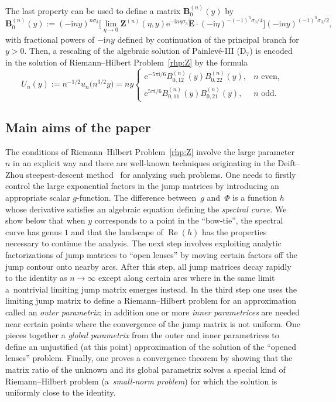\documentclass[pdftex]{sigma}
\numberwithin{equation}{section}
\begin{document}
The last property can be used to define a matrix $\mathbf{B}^{(n)}_0(y)$ by
\begin{equation}
\mathbf{B}^{(n)}_0(y):=(-\mathrm{i} ny)^{n\sigma_3}\Big[\lim_{\eta\to 0}\mathbf{Z}^{(n)}(\eta,y)\mathrm{e}^{-\mathrm{i} n\eta\sigma_3}\widetilde{\mathbf{E}}\cdot(-\mathrm{i}\eta)^{-(-1)^n\sigma_3/4}\Big](-\mathrm{i} n y)^{(-1)^n\sigma_3/2},
\label{eq:B0n}
\end{equation}
with fractional powers of $-\mathrm{i} n y$ defined by continuation of the principal branch for $y>0$.
Then, a rescaling of the algebraic solution of Painlev\'e-III (D$_7$) is encoded in the solution of Riemann--Hilbert Problem~\ref{rhp:Z} by the formula
\begin{equation}
U_n(y):=n^{-1/2}u_n\bigl(n^{3/2}y\bigr) =ny\begin{cases}\mathrm{e}^{-5\pi\mathrm{i}/6}B_{0,12}^{(n)}(y)B_{0,22}^{(n)}(y),& \text{$n$ even}, \\
\mathrm{e}^{5\pi\mathrm{i}/6}B_{0,11}^{(n)}(y)B_{0,21}^{(n)}(y),& \text{$n$ odd.}
\end{cases}
\label{eq:Uny}
\end{equation}

\subsection{Main aims of the paper}
The conditions of Riemann--Hilbert Problem~\ref{rhp:Z} involve the large parameter $n$ in an explicit way and there are well-known techniques originating in the Deift--Zhou steepest-descent method~\cite{DeiftZ93} for analyzing such problems. One needs to firstly control the large exponential factors in the jump matrices by introducing an appropriate scalar $g$-function. The difference between~$g$ and~$\Phi$ is a function $h$ whose derivative satisfies an algebraic equation defining the \emph{spectral curve}. We show below that when $y$ corresponds to a point in the ``bow-tie'', the spectral curve has genus $1$ and that the landscape of $\operatorname{Re}(h)$ has the properties necessary to continue the analysis. The next step involves exploiting analytic factorizations of jump matrices to ``open lenses'' by moving certain factors off the jump contour onto nearby arcs. After this step, all jump matrices decay rapidly to the identity as $n\to\infty$ except along certain arcs where in the same limit a~nontrivial limiting jump matrix emerges instead. In the third step one uses the limiting jump matrix to define a Riemann--Hilbert problem for an approximation called an \emph{outer parametrix}; in addition one or more \emph{inner parametrices} are needed near certain points where the convergence of the jump matrix is not uniform. One pieces together a \emph{global parametrix} from the outer and inner parametrices to define an unjustified (at this point) approximation of the solution of the ``opened lenses'' problem. Finally, one proves a convergence theorem by showing that the matrix ratio of the unknown and its global parametrix solves a special kind of Riemann--Hilbert problem (a~\emph{small-norm problem}) for which the solution is uniformly close to the identity.
\end{document}
